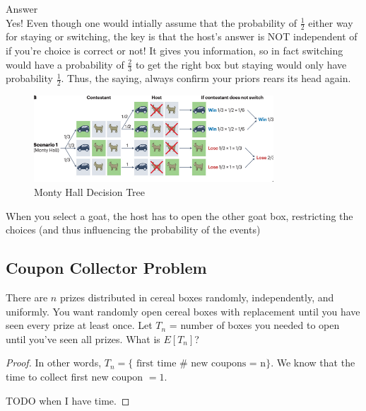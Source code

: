 \documentclass[a4paper]{article}
\begin{document}
\begin{note}{Answer}\\
  Yes! Even though one would intially assume that the probability of $\frac{1}{2}$ either way for staying or 
  switching, the key is that the host's answer is NOT independent of if you're choice is correct or not! It
  gives you information, so in fact switching would have a probability of $\frac{2}{3}$ to get the 
  right box but staying would only have probability $\frac{1}{2}$. Thus, the saying, always confirm 
  your priors rears its head again.
\end{note}

\begin{figure}[h]
  \centering
  \includegraphics[width=0.8\textwidth]{assets/monty_hall_decision_tree.png}
  \caption{Monty Hall Decision Tree}
  \label{fig:monty_hall_decision_tree}
\end{figure}
When you select a goat, the host has to open the other goat box, restricting the choices (and thus influencing the 
probability of the events)

\subsection{Coupon Collector Problem}
There are $n$ prizes distributed in cereal boxes randomly, independently, and uniformly. 
You want randomly open cereal boxes with replacement until you have seen every prize at least once. 
Let $T_n$ = number of boxes you needed to open until you've seen all prizes. 
What is  $E[T_n]$?

\begin{proof}
  In other words, $T_n = \{\text{ first time # new coupons = n}\}$. We know that the time to collect
  first new coupon $=1$. 

  TODO when I have time.

\end{proof}
\end{document}
